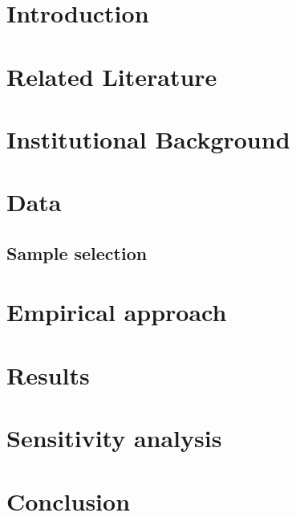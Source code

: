 \documentclass[a4paper, 10pt]{article}
\begin{document}
 

\newpage{}\setcounter{page}{1} 
\section{Introduction} \label{sec:Introduction}


\section{Related Literature} \label{sec:Literature}


\section{Institutional Background} \label{sec:InstBackground}


\section{Data} \label{sec:Data} 

\subsection{Sample selection} \label{subsec:sample}

\section{Empirical approach} \label{sec:Empirical}


\section{Results} \label{sec:Results}

\section{Sensitivity analysis} \label{sec:Sensitivity}


\section{Conclusion} \label{sec:Conclusion}


\clearpage
\printbibliography






\end{document}
